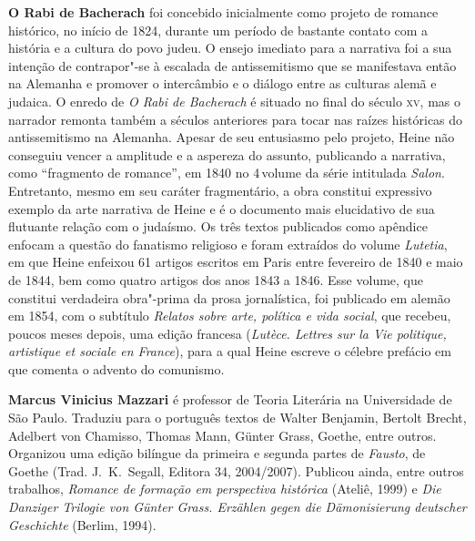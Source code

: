 \textbf{O Rabi de Bacherach} foi concebido inicialmente como projeto de romance histórico,
no início de 1824, durante um período de bastante
contato com a história e a cultura do povo judeu. O ensejo imediato
para a narrativa foi a sua intenção de contrapor"-se à escalada de
antissemitismo que se manifestava então na Alemanha e promover o
intercâmbio e o diálogo entre as culturas alemã e judaica. O enredo
de \textit{O Rabi de Bacherach} é situado no final do século \textsc{xv}, mas o
narrador remonta também a séculos anteriores para tocar nas raízes
históricas do antissemitismo na Alemanha. Apesar de seu entusiasmo
pelo projeto, Heine não conseguiu vencer a amplitude e a aspereza do
assunto, publicando a narrativa, como “fragmento de romance”, em 1840
no 4\oi\,volume da série intitulada \textit{Salon}. Entretanto, mesmo em seu
caráter fragmentário, a obra constitui expressivo exemplo da
arte narrativa de Heine e é o documento mais elucidativo de sua
flutuante relação com o judaísmo.
Os três textos publicados como apêndice enfocam a questão do
fanatismo religioso e foram extraídos do volume \textit{Lutetia}, em
que Heine enfeixou 61 artigos escritos em Paris entre fevereiro de 1840
e maio de 1844, bem como quatro artigos dos anos 1843 a 1846. Esse
volume, que constitui verdadeira obra"-prima da prosa jornalística,
foi publicado em alemão em 1854, com o subtítulo \textit{Relatos sobre
arte, política e vida social}, que recebeu, poucos meses depois, uma edição
francesa (\textit{Lutèce. Lettres sur la Vie politique, artistique et
sociale en France}), para a qual Heine escreve o célebre prefácio em
que comenta o advento do comunismo.

\textbf{Marcus Vinicius Mazzari} é professor de Teoria Literária na Universidade
de São Paulo. Traduziu para o português textos de Walter Benjamin, Bertolt
Brecht, Adelbert von Chamisso, Thomas Mann, Günter Grass, Goethe, entre outros.
Organizou uma edição bilíngue da primeira e segunda partes de \textit{Fausto},
de Goethe (Trad. J.~K.~Segall, Editora 34, 2004/2007). Publicou ainda, entre
outros trabalhos, \textit{Romance de formação em perspectiva histórica}
(Ateliê, 1999) e \textit{Die Danziger Trilogie von Günter Grass. Erzählen gegen
die Dämonisierung deutscher Geschichte} (Berlim, 1994).


